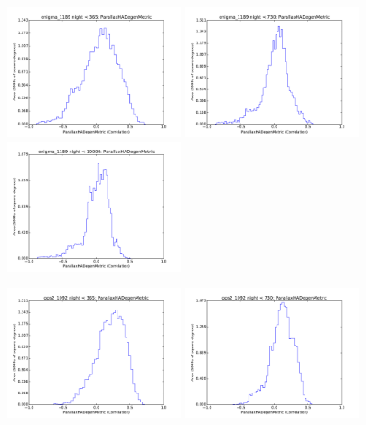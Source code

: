 \begin{figure}[ht]
  \begin{center}
  \includegraphics[width=2.0in]{./figs/milkyway/MW_Astrom_paDegen_1189_01y_hst.pdf}
  \includegraphics[width=2.0in]{./figs/milkyway/MW_Astrom_paDegen_1189_02y_hst.pdf}
  \includegraphics[width=2.0in]{./figs/milkyway/MW_Astrom_paDegen_1189_10y_hst.pdf}
  \end{center}
  \begin{center}
  \includegraphics[width=2.0in]{./figs/milkyway/MW_Astrom_paDegen_1092_01y_hst.pdf}
  \includegraphics[width=2.0in]{./figs/milkyway/MW_Astrom_paDegen_1092_02y_hst.pdf}

\end{center}
\end{figure}
